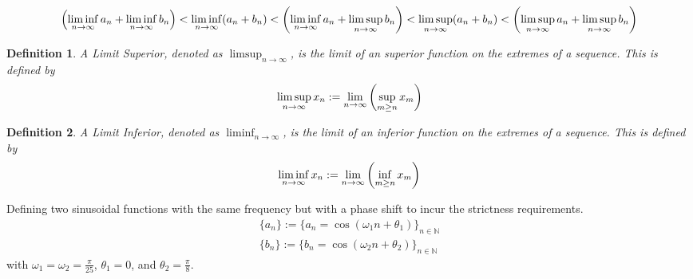 \documentclass[]{article}
\newcommand{\N}{\mathbb{N}}
\newtheorem{definition}{Definition}
\begin{document}
\[
    \qty(\liminf_{n\to\infty} {a_n} + \liminf_{n\to\infty} {b_n}) 
    < \liminf_{n\to\infty} (a_n + b_n)
    < \qty(\liminf_{n\to\infty} {a_n} + \limsup_{n\to\infty} {b_n})
    < \limsup_{n\to\infty} (a_n + b_n)
    < \qty(\limsup_{n\to\infty} {a_n} + \limsup_{n\to\infty} {b_n})
\]

\begin{definition}
    A \emph{Limit Superior}, denoted as $\limsup_{n\to\infty}$, is the limit of an superior function on the extremes of a sequence. This is defined by 
    \[\limsup_{n\to\infty} x_n := \lim_{n\to\infty} \qty(\sup_{m\geq n}x_m)\]
\end{definition}
\begin{definition}
A \emph{Limit Inferior}, denoted as $\liminf_{n\to\infty}$, is the limit of an inferior function on the extremes of a sequence. This is defined by 
    \[\liminf_{n\to\infty} x_n := \lim_{n\to\infty} \qty(\inf_{m\geq n}x_m)\]
\end{definition}

Defining two sinusoidal functions with the same frequency but with a phase shift to incur the strictness requirements.
\begin{align*}
    \{a_n\} := \{a_n = \cos(\omega_1 n + \theta_1)\}_{n \in \N}\\
    \{b_n\} := \{b_n = \cos(\omega_2 n + \theta_2)\}_{n \in \N}
\end{align*}
with $\omega_1 = \omega_2 = \frac{\pi}{25}$, $\theta_1 = 0$, and $\theta_2 = \frac{\pi}{8}$.




\newpage
\end{document}
